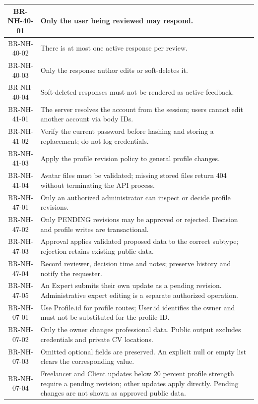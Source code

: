 \begin{longtable}{|c|p{12cm}|}
BR-NH-40-01 & Only the user being reviewed may respond. \\ \hline
BR-NH-40-02 & There is at most one active response per review. \\ \hline
BR-NH-40-03 & Only the response author edits or soft-deletes it. \\ \hline
BR-NH-40-04 & Soft-deleted responses must not be rendered as active feedback. \\ \hline
BR-NH-41-01 & The server resolves the account from the session; users cannot edit another account via body IDs. \\ \hline
BR-NH-41-02 & Verify the current password before hashing and storing a replacement; do not log credentials. \\ \hline
BR-NH-41-03 & Apply the profile revision policy to general profile changes. \\ \hline
BR-NH-41-04 & Avatar files must be validated; missing stored files return 404 without terminating the API process. \\ \hline
BR-NH-47-01 & Only an authorized administrator can inspect or decide profile revisions. \\ \hline
BR-NH-47-02 & Only PENDING revisions may be approved or rejected. Decision and profile writes are transactional. \\ \hline
BR-NH-47-03 & Approval applies validated proposed data to the correct subtype; rejection retains existing public data. \\ \hline
BR-NH-47-04 & Record reviewer, decision time and notes; preserve history and notify the requester. \\ \hline
BR-NH-47-05 & An Expert submits their own update as a pending revision. Administrative expert editing is a separate authorized operation. \\ \hline
BR-NH-07-01 & Use Profile.id for profile routes; User.id identifies the owner and must not be substituted for the profile ID. \\ \hline
BR-NH-07-02 & Only the owner changes professional data. Public output excludes credentials and private CV locations. \\ \hline
BR-NH-07-03 & Omitted optional fields are preserved. An explicit null or empty list clears the corresponding value. \\ \hline
BR-NH-07-04 & Freelancer and Client updates below 20 percent profile strength require a pending revision; other updates apply directly. Pending changes are not shown as approved public data. \\ \hline

\end{longtable}
